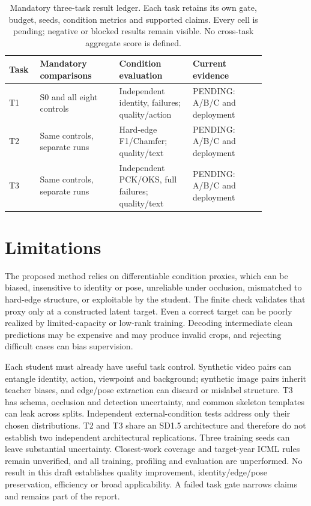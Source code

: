\documentclass{article}
\newcommand{\pending}{\textsf{PENDING}}
\begin{document}
\begin{table}[t]
\centering\small
\begin{tabular}{p{0.08\linewidth}p{0.27\linewidth}p{0.25\linewidth}p{0.25\linewidth}}
\toprule
Task & Mandatory comparisons & Condition evaluation & Current evidence\\
\midrule
T1 & S0 and all eight controls & Independent identity, failures; quality/action & \pending: A/B/C and deployment\\
T2 & Same controls, separate runs & Hard-edge F1/Chamfer; quality/text & \pending: A/B/C and deployment\\
T3 & Same controls, separate runs & Independent PCK/OKS, full failures; quality/text & \pending: A/B/C and deployment\\
\bottomrule
\end{tabular}
\caption{Mandatory three-task result ledger. Each task retains its own gate, budget, seeds, condition metrics and supported claims. Every cell is pending; negative or blocked results remain visible. No cross-task aggregate score is defined.}
\end{table}

\section{Limitations}
The proposed method relies on differentiable condition proxies, which can be biased, insensitive to identity or pose, unreliable under occlusion, mismatched to hard-edge structure, or exploitable by the student. The finite check validates that proxy only at a constructed latent target. Even a correct target can be poorly realized by limited-capacity or low-rank training. Decoding intermediate clean predictions may be expensive and may produce invalid crops, and rejecting difficult cases can bias supervision.

Each student must already have useful task control. Synthetic video pairs can entangle identity, action, viewpoint and background; synthetic image pairs inherit teacher biases, and edge/pose extraction can discard or mislabel structure. T3 has schema, occlusion and detection uncertainty, and common skeleton templates can leak across splits. Independent external-condition tests address only their chosen distributions. T2 and T3 share an SD1.5 architecture and therefore do not establish two independent architectural replications. Three training seeds can leave substantial uncertainty. Closest-work coverage and target-year ICML rules remain unverified, and all training, profiling and evaluation are unperformed. No result in this draft establishes quality improvement, identity/edge/pose preservation, efficiency or broad applicability. A failed task gate narrows claims and remains part of the report.
\end{document}
